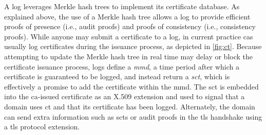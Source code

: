 A log leverages Merkle hash trees to implement its certificate database. As
explained above, the use of a Merkle hash tree allows a log to provide efficient
proofs of presence (i.e., audit proofs) and proofs of consistency (i.e.,
consistency proofs). While anyone may submit a certificate to a log, in current
practice \acp{ca} usually log certificates during the issuance process, as
depicted in \autoref{fig:ct}. Because attempting to update the Merkle hash tree
in real time may delay or block the certificate issuance process, logs define a
\emph{\ac{mmd}}, a time period after which a certificate is guaranteed to be
logged, and instead return a \emph{\ac{sct}}, which is effectively a promise to
add the certificate within the \ac{mmd}. The \ac{sct} is embedded into the
\ac{ca}-issued certificate as an X.509 extension and used to signal that a
domain uses \ac{ct} and that its certificate has been logged. Alternately, the
domain can send extra information such as \acp{sct} or audit proofs in the
\ac{tls} handshake using a \ac{tls} protocol extension.


